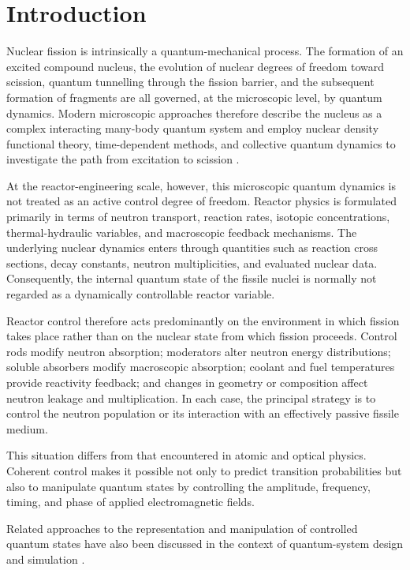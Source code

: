 \section{Introduction}
\label{sec:introduction}

Nuclear fission is intrinsically a quantum-mechanical process. The formation of an excited compound nucleus, the evolution of nuclear degrees of freedom toward scission, quantum tunnelling through the fission barrier, and the subsequent formation of fragments are all governed, at the microscopic level, by quantum dynamics. Modern microscopic approaches therefore describe the nucleus as a complex interacting many-body quantum system and employ nuclear density functional theory, time-dependent methods, and collective quantum dynamics to investigate the path from excitation to scission \cite{SchunckRobledo2016}.

At the reactor-engineering scale, however, this microscopic quantum dynamics is not treated as an active control degree of freedom. Reactor physics is formulated primarily in terms of neutron transport, reaction rates, isotopic concentrations, thermal-hydraulic variables, and macroscopic feedback mechanisms. The underlying nuclear dynamics enters through quantities such as reaction cross sections, decay constants, neutron multiplicities, and evaluated nuclear data. Consequently, the internal quantum state of the fissile nuclei is normally not regarded as a dynamically controllable reactor variable.

Reactor control therefore acts predominantly on the environment in which fission takes place rather than on the nuclear state from which fission proceeds. Control rods modify neutron absorption; moderators alter neutron energy distributions; soluble absorbers modify macroscopic absorption; coolant and fuel temperatures provide reactivity feedback; and changes in geometry or composition affect neutron leakage and multiplication. In each case, the principal strategy is to control the neutron population or its interaction with an effectively passive fissile medium.

This situation differs from that encountered in atomic and optical physics. Coherent control makes it possible not only to predict transition probabilities but also to manipulate quantum states by controlling the amplitude, frequency, timing, and phase of applied electromagnetic fields.

Related approaches to the representation and manipulation of controlled
quantum states have also been discussed in the context of quantum-system
design and simulation \cite{SisiniPC}.

